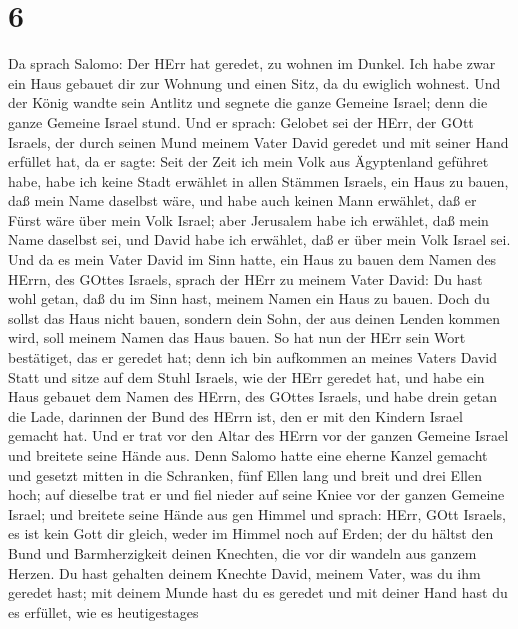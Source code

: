 \hypertarget{section-5}{%
\section{6}\label{section-5}}

 Da sprach Salomo: Der HErr hat geredet, zu wohnen im
Dunkel.  Ich habe zwar ein Haus gebauet dir zur Wohnung und
einen Sitz, da du ewiglich wohnest.  Und der König wandte
sein Antlitz und segnete die ganze Gemeine Israel; denn die ganze
Gemeine Israel stund.  Und er sprach: Gelobet sei der HErr,
der GOtt Israels, der durch seinen Mund meinem Vater David geredet und
mit seiner Hand erfüllet hat, da er sagte:  Seit der Zeit
ich mein Volk aus Ägyptenland geführet habe, habe ich keine Stadt
erwählet in allen Stämmen Israels, ein Haus zu bauen, daß mein Name
daselbst wäre, und habe auch keinen Mann erwählet, daß er Fürst wäre
über mein Volk Israel;  aber Jerusalem habe ich erwählet,
daß mein Name daselbst sei, und David habe ich erwählet, daß er über
mein Volk Israel sei.  Und da es mein Vater David im Sinn
hatte, ein Haus zu bauen dem Namen des HErrn, des GOttes Israels,
 sprach der HErr zu meinem Vater David: Du hast wohl getan,
daß du im Sinn hast, meinem Namen ein Haus zu bauen.  Doch
du sollst das Haus nicht bauen, sondern dein Sohn, der aus deinen Lenden
kommen wird, soll meinem Namen das Haus bauen.  So hat nun
der HErr sein Wort bestätiget, das er geredet hat; denn ich bin
aufkommen an meines Vaters David Statt und sitze auf dem Stuhl Israels,
wie der HErr geredet hat, und habe ein Haus gebauet dem Namen des HErrn,
des GOttes Israels,  und habe drein getan die Lade,
darinnen der Bund des HErrn ist, den er mit den Kindern Israel gemacht
hat.  Und er trat vor den Altar des HErrn vor der ganzen
Gemeine Israel und breitete seine Hände aus.  Denn Salomo
hatte eine eherne Kanzel gemacht und gesetzt mitten in die Schranken,
fünf Ellen lang und breit und drei Ellen hoch; auf dieselbe trat er und
fiel nieder auf seine Kniee vor der ganzen Gemeine Israel; und breitete
seine Hände aus gen Himmel  und sprach: HErr, GOtt Israels,
es ist kein Gott dir gleich, weder im Himmel noch auf Erden; der du
hältst den Bund und Barmherzigkeit deinen Knechten, die vor dir wandeln
aus ganzem Herzen.  Du hast gehalten deinem Knechte David,
meinem Vater, was du ihm geredet hast; mit deinem Munde hast du es
geredet und mit deiner Hand hast du es erfüllet, wie es heutigestages
